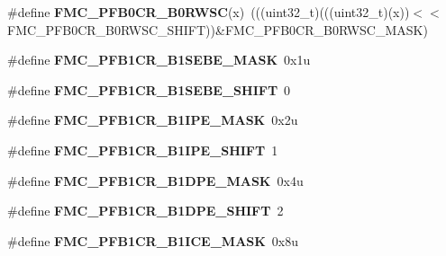 \begin{DoxyCompactItemize}
\item 
\#define {\bfseries F\+M\+C\+\_\+\+P\+F\+B0\+C\+R\+\_\+\+B0\+R\+W\+SC}(x)~(((uint32\+\_\+t)(((uint32\+\_\+t)(x))$<$$<$F\+M\+C\+\_\+\+P\+F\+B0\+C\+R\+\_\+\+B0\+R\+W\+S\+C\+\_\+\+S\+H\+I\+FT))\&F\+M\+C\+\_\+\+P\+F\+B0\+C\+R\+\_\+\+B0\+R\+W\+S\+C\+\_\+\+M\+A\+SK)\hypertarget{group__FMC__Register__Masks_ga0741c38adeb4e926ab47b65f71ab369d}{}\label{group__FMC__Register__Masks_ga0741c38adeb4e926ab47b65f71ab369d}

\item 
\#define {\bfseries F\+M\+C\+\_\+\+P\+F\+B1\+C\+R\+\_\+\+B1\+S\+E\+B\+E\+\_\+\+M\+A\+SK}~0x1u\hypertarget{group__FMC__Register__Masks_ga420c5676807fc85197707ac092c58221}{}\label{group__FMC__Register__Masks_ga420c5676807fc85197707ac092c58221}

\item 
\#define {\bfseries F\+M\+C\+\_\+\+P\+F\+B1\+C\+R\+\_\+\+B1\+S\+E\+B\+E\+\_\+\+S\+H\+I\+FT}~0\hypertarget{group__FMC__Register__Masks_ga8666915cae16d07904756da796935f3c}{}\label{group__FMC__Register__Masks_ga8666915cae16d07904756da796935f3c}

\item 
\#define {\bfseries F\+M\+C\+\_\+\+P\+F\+B1\+C\+R\+\_\+\+B1\+I\+P\+E\+\_\+\+M\+A\+SK}~0x2u\hypertarget{group__FMC__Register__Masks_ga282ed00b64bb32336610c04d1404e86d}{}\label{group__FMC__Register__Masks_ga282ed00b64bb32336610c04d1404e86d}

\item 
\#define {\bfseries F\+M\+C\+\_\+\+P\+F\+B1\+C\+R\+\_\+\+B1\+I\+P\+E\+\_\+\+S\+H\+I\+FT}~1\hypertarget{group__FMC__Register__Masks_ga6685876e76f4ea584622a68f6bea6b56}{}\label{group__FMC__Register__Masks_ga6685876e76f4ea584622a68f6bea6b56}

\item 
\#define {\bfseries F\+M\+C\+\_\+\+P\+F\+B1\+C\+R\+\_\+\+B1\+D\+P\+E\+\_\+\+M\+A\+SK}~0x4u\hypertarget{group__FMC__Register__Masks_gad8ceabcc8b8c9f94ac2216c3bf87f3af}{}\label{group__FMC__Register__Masks_gad8ceabcc8b8c9f94ac2216c3bf87f3af}

\item 
\#define {\bfseries F\+M\+C\+\_\+\+P\+F\+B1\+C\+R\+\_\+\+B1\+D\+P\+E\+\_\+\+S\+H\+I\+FT}~2\hypertarget{group__FMC__Register__Masks_ga9a6d2f7bfce24b100a34731744602db7}{}\label{group__FMC__Register__Masks_ga9a6d2f7bfce24b100a34731744602db7}

\item 
\#define {\bfseries F\+M\+C\+\_\+\+P\+F\+B1\+C\+R\+\_\+\+B1\+I\+C\+E\+\_\+\+M\+A\+SK}~0x8u\hypertarget{group__FMC__Register__Masks_ga54e7a000de93d88f2b6287e197890347}{}\label{group__FMC__Register__Masks_ga54e7a000de93d88f2b6287e197890347}


\end{DoxyCompactItemize}
